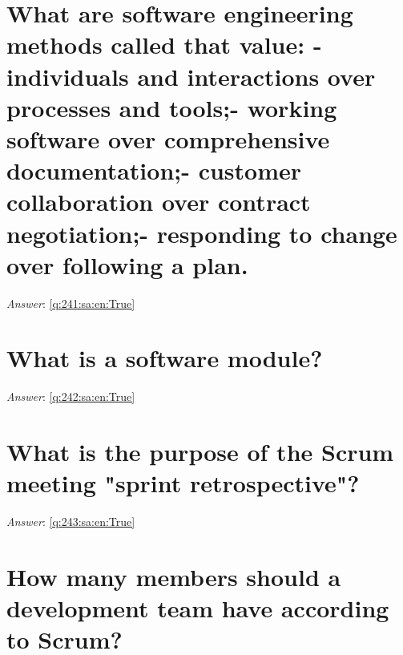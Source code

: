 \documentclass[a4paper,11pt,oneside]{book}
\begin{document}
\begin{sloppypar}
\section{What are software engineering methods called that value: - individuals and interactions over processes and tools;- working software over comprehensive documentation;- customer collaboration over contract negotiation;- responding to change over following a plan.}

\label{q:241:sa:en:False}

\vspace{2cm}

\noindent\makebox[\textwidth]{\hrulefill}

\vspace{1cm}

\textit{Answer}: \autoref{q:241:sa:en:True}



\section{What is a software module?}

\label{q:242:sa:en:False}

\vspace{2cm}

\noindent\makebox[\textwidth]{\hrulefill}

\vspace{1cm}

\textit{Answer}: \autoref{q:242:sa:en:True}



\section{What is the purpose of the Scrum meeting "sprint retrospective"?}

\label{q:243:sa:en:False}

\vspace{2cm}

\noindent\makebox[\textwidth]{\hrulefill}

\vspace{1cm}

\textit{Answer}: \autoref{q:243:sa:en:True}



\section{How many members should a development team have according to Scrum?}


\end{sloppypar}
\end{document}
